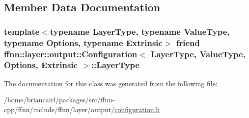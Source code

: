 \subsection{Member Data Documentation}
\hypertarget{classffnn_1_1layer_1_1output_1_1_configuration_a91d957d5fc4cd2f9dcf348096fb013eb}{
\subsubsection[{Layer\-Type}]{\setlength{\rightskip}{0pt plus 5cm}template$<$typename Layer\-Type, typename Value\-Type, typename Options, typename Extrinsic$>$ friend {\bf ffnn\-::layer\-::output\-::\-Configuration}$<$ Layer\-Type, Value\-Type, Options, Extrinsic $>$\-::Layer\-Type}}\label{classffnn_1_1layer_1_1output_1_1_configuration_a91d957d5fc4cd2f9dcf348096fb013eb}


The documentation for this class was generated from the following file\-:\begin{DoxyCompactItemize}
\item 
/home/briancairl/packages/src/ffnn-\/cpp/ffnn/include/ffnn/layer/output/\hyperlink{output_2configuration_8h}{configuration.\-h}\end{DoxyCompactItemize}
